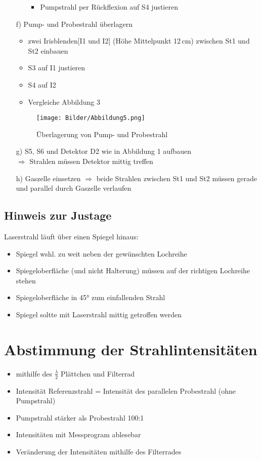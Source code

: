 \documentclass[a4paper, twoside]{article}
\begin{document}
\begin{itemize}
\begin{itemize}
\begin{itemize}
            \item Pumpstrahl per Rückflexion auf S4 justieren
        \end{itemize}
    \end{itemize}
  \item[f)] Pump- und Probestrahl überlagern
  \begin{itemize}
      \item zwei Irisblenden[I1 und I2] (Höhe Mittelpunkt 12\,cm) zwischen St1 und St2 einbauen
      \item S3 auf I1 justieren 
      \item S4 auf I2
      \item Vergleiche Abbildung 3
  \end{itemize} 
  \begin{figure}[h]
    \centering
    \texttt{[image: Bilder/Abbildung5.png]}
    \caption{Überlagerung von Pump- und Probestrahl}
   \end{figure}
   \newpage
  \item[g)] S5, S6 und Detektor D2 wie in Abbildung 1 aufbauen\\
  $\Rightarrow$ Strahlen müssen Detektor mittig treffen
  \item[h)] Gaszelle einsetzen
  $\Rightarrow$  beide Strahlen zwischen St1 und St2 müssen gerade und parallel durch Gaszelle verlaufen
\end{itemize}
\subsection{Hinweis zur Justage}
Laserstrahl läuft über einen Spiegel hinaus:
\begin{itemize}
    \item  Spiegel wshl. zu weit neben der gewünschten Lochreihe
    \item Spiegeloberfläche (und nicht Halterung) müssen auf der richtigen Lochreihe stehen
    \item  Spiegeloberfläche in 45° zum einfallenden Strahl 
    \item Spiegel soltte mit Laserstrahl mittig getroffen werden
\end{itemize}
\section{Abstimmung der Strahlintensitäten}
\begin{itemize}
    \item mithilfe des $\frac{\lambda}{2}$ Plättchen und Filterrad
    \item Intensität Referenzstrahl = Intensität des parallelen Probestrahl (ohne Pumpstrahl)
    \item Pumpstrahl stärker als Probestrahl 100:1
    \item Intensitäten mit Messprogram ablesebar
    \item Veränderung der Intensitäten mithilfe des Filterrades
\end{itemize}
\end{document}
